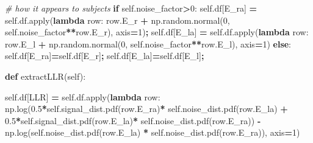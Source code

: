 \documentclass[12pt,twoside]{reedthesis}
\newenvironment{Shaded}{\begin{snugshade}}{\end{snugshade}}
\newcommand{\BuiltInTok}[1]{#1}
\newcommand{\CommentTok}[1]{\textcolor[rgb]{0.56,0.35,0.01}{\textit{#1}}}
\newcommand{\ControlFlowTok}[1]{\textcolor[rgb]{0.13,0.29,0.53}{\textbf{#1}}}
\newcommand{\DecValTok}[1]{\textcolor[rgb]{0.00,0.00,0.81}{#1}}
\newcommand{\FloatTok}[1]{\textcolor[rgb]{0.00,0.00,0.81}{#1}}
\newcommand{\KeywordTok}[1]{\textcolor[rgb]{0.13,0.29,0.53}{\textbf{#1}}}
\newcommand{\NormalTok}[1]{#1}
\newcommand{\OperatorTok}[1]{\textcolor[rgb]{0.81,0.36,0.00}{\textbf{#1}}}
\newcommand{\StringTok}[1]{\textcolor[rgb]{0.31,0.60,0.02}{#1}}
\newcommand{\VariableTok}[1]{\textcolor[rgb]{0.00,0.00,0.00}{#1}}
\begin{document}
\begin{Shaded}
\begin{Highlighting}[]
        \CommentTok{\# how it appears to subjects}
        \ControlFlowTok{if} \VariableTok{self}\NormalTok{.noise\_factor}\OperatorTok{\textgreater{}}\DecValTok{0}\NormalTok{:}
          \VariableTok{self}\NormalTok{.df[}\StringTok{\textquotesingle{}E\_ra\textquotesingle{}}\NormalTok{] }\OperatorTok{=} \VariableTok{self}\NormalTok{.df.}\BuiltInTok{apply}\NormalTok{(}\KeywordTok{lambda}\NormalTok{ row: row.E\_r }\OperatorTok{+}
\NormalTok{                 np.random.normal(}\DecValTok{0}\NormalTok{, }\VariableTok{self}\NormalTok{.noise\_factor}\OperatorTok{**}\NormalTok{row.E\_r), }
\NormalTok{                 axis}\OperatorTok{=}\DecValTok{1}\NormalTok{)}\OperatorTok{;}
          \VariableTok{self}\NormalTok{.df[}\StringTok{\textquotesingle{}E\_la\textquotesingle{}}\NormalTok{] }\OperatorTok{=} \VariableTok{self}\NormalTok{.df.}\BuiltInTok{apply}\NormalTok{(}\KeywordTok{lambda}\NormalTok{ row: row.E\_l }\OperatorTok{+}
\NormalTok{                 np.random.normal(}\DecValTok{0}\NormalTok{, }\VariableTok{self}\NormalTok{.noise\_factor}\OperatorTok{**}\NormalTok{row.E\_l), }
\NormalTok{                 axis}\OperatorTok{=}\DecValTok{1}\NormalTok{)}
        \ControlFlowTok{else}\NormalTok{:}
          \VariableTok{self}\NormalTok{.df[}\StringTok{\textquotesingle{}E\_ra\textquotesingle{}}\NormalTok{]}\OperatorTok{=}\VariableTok{self}\NormalTok{.df[}\StringTok{\textquotesingle{}E\_r\textquotesingle{}}\NormalTok{]}\OperatorTok{;}
          \VariableTok{self}\NormalTok{.df[}\StringTok{\textquotesingle{}E\_la\textquotesingle{}}\NormalTok{]}\OperatorTok{=}\VariableTok{self}\NormalTok{.df[}\StringTok{\textquotesingle{}E\_l\textquotesingle{}}\NormalTok{]}\OperatorTok{;}
    
    \KeywordTok{def}\NormalTok{ extractLLR(}\VariableTok{self}\NormalTok{):}
        
        \VariableTok{self}\NormalTok{.df[}\StringTok{\textquotesingle{}LLR\textquotesingle{}}\NormalTok{] }\OperatorTok{=} \VariableTok{self}\NormalTok{.df.}\BuiltInTok{apply}\NormalTok{(}\KeywordTok{lambda}\NormalTok{ row: }
\NormalTok{               np.log(}\FloatTok{0.5}\OperatorTok{*}\VariableTok{self}\NormalTok{.signal\_dist.pdf(row.E\_ra)}\OperatorTok{*} 
               \VariableTok{self}\NormalTok{.noise\_dist.pdf(row.E\_la) }\OperatorTok{+} 
               \FloatTok{0.5}\OperatorTok{*}\VariableTok{self}\NormalTok{.signal\_dist.pdf(row.E\_la)}\OperatorTok{*} 
               \VariableTok{self}\NormalTok{.noise\_dist.pdf(row.E\_ra)) }\OperatorTok{{-}} 
\NormalTok{               np.log(}\VariableTok{self}\NormalTok{.noise\_dist.pdf(row.E\_la) }\OperatorTok{*} 
               \VariableTok{self}\NormalTok{.noise\_dist.pdf(row.E\_ra)), }
\NormalTok{               axis}\OperatorTok{=}\DecValTok{1}\NormalTok{)}
               

\end{Highlighting}
\end{Shaded}
\end{document}
